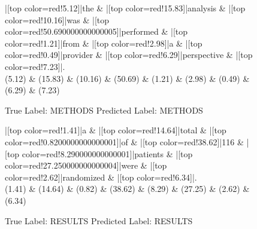 \documentclass[a4paper, landscape]{article}
\begin{document}
\begin{figure}
\begin{center}
\begin{dependency}
\begin{deptext}
|[top color=red!5.12]|the \& |[top color=red!15.83]|analysis \& |[top color=red!10.16]|was \& |[top color=red!50.690000000000005]|performed \& |[top color=red!1.21]|from \& |[top color=red!2.98]|a \& |[top color=red!0.49]|provider \& |[top color=red!6.29]|perspective \& |[top color=red!7.23]|.\\
(5.12) \& (15.83) \& (10.16) \& (50.69) \& (1.21) \& (2.98) \& (0.49) \& (6.29) \& (7.23)\\
\end{deptext}
\end{dependency}
\end{center}
\caption{True Label: METHODS Predicted Label: METHODS}
\end{figure}
\clearpage
\begin{figure}
\begin{center}
\begin{dependency}
\begin{deptext}
|[top color=red!1.41]|a \& |[top color=red!14.64]|total \& |[top color=red!0.8200000000000001]|of \& |[top color=red!38.62]|116 \& |[top color=red!8.290000000000001]|patients \& |[top color=red!27.250000000000004]|were \& |[top color=red!2.62]|randomized \& |[top color=red!6.34]|.\\
(1.41) \& (14.64) \& (0.82) \& (38.62) \& (8.29) \& (27.25) \& (2.62) \& (6.34)\\
\end{deptext}
\end{dependency}
\end{center}
\caption{True Label: RESULTS Predicted Label: RESULTS}
\end{figure}
\clearpage
\end{document}
